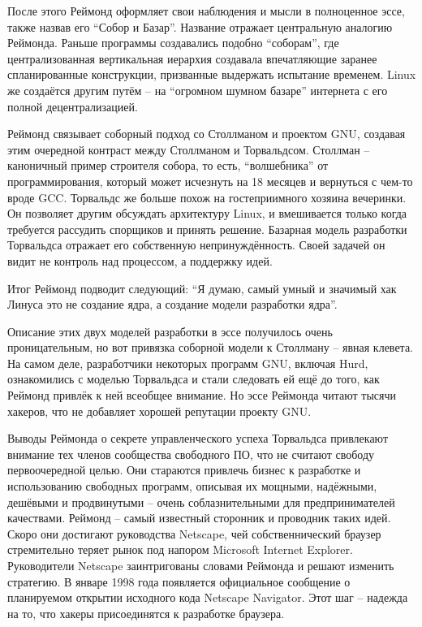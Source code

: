 После этого Реймонд оформляет свои наблюдения и мысли в полноценное эссе, также назвав его ``Собор и Базар''. Название отражает центральную аналогию Реймонда. Раньше программы создавались подобно ``соборам'', где централизованная вертикальная иерархия создавала впечатляющие заранее спланированные конструкции, призванные выдержать испытание временем. Linux же создаётся другим путём -- на ``огромном шумном базаре'' интернета с его полной децентрализацией.

Реймонд связывает соборный подход со Столлманом и проектом GNU, создавая этим очередной контраст между Столлманом и Торвальдсом. Столлман -- каноничный пример строителя собора, то есть, ``волшебника'' от программирования, который может исчезнуть на 18 месяцев и вернуться с чем-то вроде GCC. Торвальдс же больше похож на гостеприимного хозяина вечеринки. Он позволяет другим обсуждать архитектуру Linux, и вмешивается только когда требуется рассудить спорщиков и принять решение. Базарная модель разработки Торвальдса отражает его собственную непринуждённость. Своей задачей он видит не контроль над процессом, а поддержку идей.

Итог Реймонд подводит следующий: ``Я думаю, самый умный и значимый хак Линуса это не создание ядра, а создание модели разработки ядра''.

Описание этих двух моделей разработки в эссе получилось очень проницательным, но вот привязка соборной модели к Столлману -- явная клевета. На самом деле, разработчики некоторых программ GNU, включая Hurd, ознакомились с моделью Торвальдса и стали следовать ей ещё до того, как Реймонд привлёк к ней всеобщее внимание. Но эссе Реймонда читают тысячи хакеров, что не добавляет хорошей репутации проекту GNU.

Выводы Реймонда о секрете управленческого успеха Торвальдса привлекают внимание тех членов сообщества свободного ПО, что не считают свободу первоочередной целью. Они стараются привлечь бизнес к разработке и использованию свободных программ, описывая их мощными, надёжными, дешёвыми и продвинутыми -- очень соблазнительными для предпринимателей качествами. Реймонд -- самый известный сторонник и проводник таких идей. Скоро они достигают руководства Netscape, чей собственнический браузер стремительно теряет рынок под напором Microsoft Internet Explorer. Руководители Netscape заинтригованы словами Реймонда и решают изменить стратегию. В январе 1998 года появляется официальное сообщение о планируемом открытии исходного кода Netscape Navigator. Этот шаг -- надежда на то, что хакеры присоединятся к разработке браузера.

